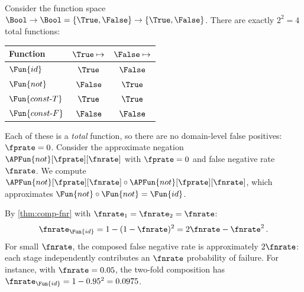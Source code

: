 \documentclass[ ../main.tex]{subfiles}
\begin{document}
\begin{example}
\label{ex:bool}
Consider the function space
$\Bool \to \Bool = \{\True,\False\} \to \{\True,\False\}$.
There are exactly $2^2 = 4$ total functions:
\begin{center}
\begin{tabular}{@{} l c c @{}}
\toprule
Function & $\True \mapsto$ & $\False \mapsto$ \\
\midrule
$\Fun{id}$          & $\True$  & $\False$ \\
$\Fun{not}$         & $\False$ & $\True$  \\
$\Fun{const\text{-}T}$ & $\True$  & $\True$  \\
$\Fun{const\text{-}F}$ & $\False$ & $\False$ \\
\bottomrule
\end{tabular}
\end{center}

Each of these is a \emph{total} function, so there are no domain-level false
positives: $\fprate = 0$.
Consider the approximate negation
$\APFun{not}[\fprate][\fnrate]$ with $\fprate = 0$ and false negative rate $\fnrate$.
We compute $\APFun{not}[\fprate][\fnrate] \circ
\APFun{not}[\fprate][\fnrate]$, which approximates
$\Fun{not} \circ \Fun{not} = \Fun{id}$.

By \cref{thm:comp-fnr} with $\fnrate_1 = \fnrate_2 = \fnrate$:
\begin{equation}
\fnrate_{\Fun{id}} = 1 - (1-\fnrate)^2 = 2\fnrate - \fnrate^2\,.
\end{equation}
For small $\fnrate$, the composed false negative rate is approximately
$2\fnrate$: each stage independently
contributes an $\fnrate$ probability of failure.
For instance, with $\fnrate = 0.05$, the two-fold composition has
$\fnrate_{\Fun{id}} = 1 - 0.95^2 = 0.0975$.
\end{example}
\end{document}
